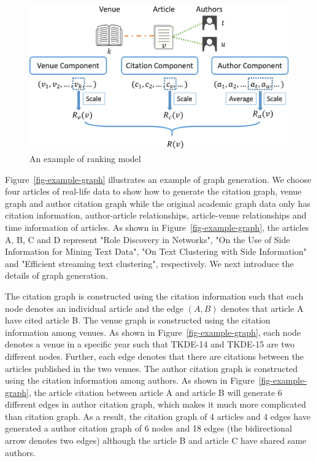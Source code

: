 \begin{figure}[tb!]
\centering
\includegraphics[scale=0.35]{fig/example-ranking.eps}
\vspace{-1ex}
\caption{\small An example of ranking model \ensemblerank} \label{fig-example-model}
\vspace{-3ex}
\end{figure}

\begin{example} \label{eg-layer-dag}
Figure~\ref{fig-example-graph} illustrates an example of graph generation. We choose four articles of real-life data to show how to generate the citation graph, venue graph and author citation graph while the original academic graph data only has citation information, author-article relationships, article-venue relationships and time information of articles. As shown in Figure~\ref{fig-example-graph}, the articles A, B, C and D represent "Role Discovery in Networks", "On the Use of Side Information for Mining Text Data", "On Text Clustering with Side Information" and "Efficient streaming text clustering", respectively. We next introduce the details of graph generation.

The citation graph is constructed using the citation information such that each node denotes an individual article and the edge $(A,B)$ denotes that article A have cited article B. The venue graph is constructed using the citation information among venues. As shown in Figure~\ref{fig-example-graph}, each node denotes a venue in a specific year such that TKDE-14 and TKDE-15 are two different nodes. Further, each edge denotes that there are citations between the articles published in the two venues. The author citation graph is constructed using the citation information among authors. As shown in Figure~\ref{fig-example-graph}, the article citation between article A and article B will generate 6 different edges in author citation graph, which makes it much more complicated than citation graph. As a result, the citation graph of 4 articles and 4 edges have generated a author citation graph of 6 nodes and 18 edges (the bidirectional arrow denotes two edges) although the article B and article C have shared same authors.
\end{example}

